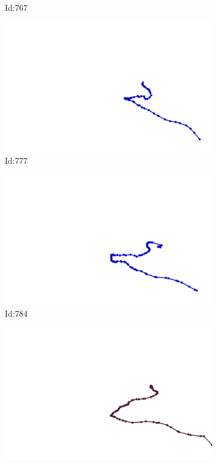 \documentclass[12pt,twoside]{report}
\begin{document}
\begin{figure}
\begin{subfigure}[b]{0.20\textwidth}
\caption{Id:767}
\end{subfigure}
\begin{subfigure}[b]{0.20\textwidth}
\centering
\includegraphics[width=\textwidth]{../trajectories/777.png}
\caption{Id:777}
\end{subfigure}
\begin{subfigure}[b]{0.20\textwidth}
\centering
\includegraphics[width=\textwidth]{../trajectories/784.png}
\caption{Id:784}
\end{subfigure}
\begin{subfigure}[b]{0.20\textwidth}
\centering
\includegraphics[width=\textwidth]{../trajectories/865.png}

\end{subfigure}
\end{figure}
\end{document}
